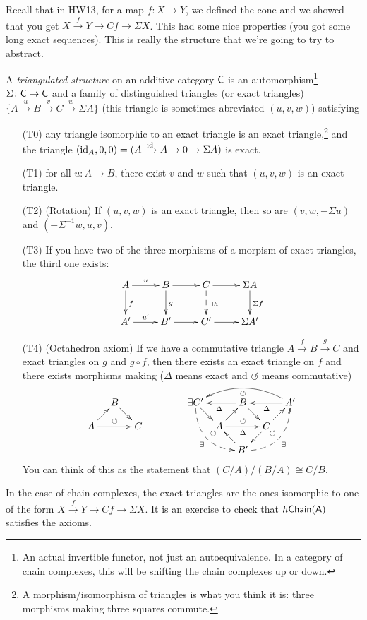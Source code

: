 Recall that in HW13, for a map $f\colon X\to Y$, we defined the cone and we showed that you get $X\xrightarrow f Y\to Cf\to \Sigma X$. This had some nice properties (you got some long exact sequences). This is really the structure that we're going to try to abstract.
\begin{definition}[Verdier]
 A \emph{triangulated structure} on an additive category $\text{\sf C}$ is an automorphism\footnote{An actual invertible functor, not just an autoequivalence. In a category of chain complexes, this will be shifting the chain complexes up or down.} $\Sigma\colon \text{\sf C}\to \text{\sf C}$ and a family of distinguished triangles (or exact triangles) $\{A\xrightarrow u B\xrightarrow v C \xrightarrow w \Sigma A\}$ (this triangle is sometimes abreviated $(u,v,w)$) satisfying
 \begin{enumerate}
  \item[(T0)] any triangle isomorphic to an exact triangle is an exact triangle,\footnote{A morphism/isomorphism of triangles is what you think it is: three morphisms making three squares commute.} and the triangle $(\operatorname{id}_A,0,0)=(A\xrightarrow {\operatorname{id}} A\to 0\to \Sigma A)$ is exact.
  \item[(T1)] for all $u\colon A\to B$, there exist $v$ and $w$ such that $(u,v,w)$ is an exact triangle.
  \item[(T2)] (Rotation) If $(u,v,w)$ is an exact triangle, then so are $(v,w,-\Sigma u)$ and $(-\Sigma^{-1}w,u,v)$. 
  \item[(T3)] If you have two of the three morphisms of a morpism of exact triangles, the third one exists:
  \[\xymatrix{
   A\ar[r]^u \ar[d]^{f} & B\ar[r]\ar[d]^g & C\ar[r]\ar@{-->}[d]^{\exists h} & \Sigma A \ar[d]^{\Sigma f}\\
   A'\ar[r]^{u'} & B'\ar[r] & C'\ar[r] & \Sigma A'
  }\]
  \item[(T4)] (Octahedron axiom) If we have a commutative triangle $A\xrightarrow f B\xrightarrow g C$ and exact triangles on $g$ and $g\circ f$, then there exists an exact triangle on $f$ and there exists morphisms making ($\Delta$ means exact and $\circlearrowleft$ means commutative)
 \[\xymatrix@!0{
  & B\ar[dr]\\
  A\ar[ur]\ar[rr]^\circlearrowleft & & C
 }\qquad\qquad\xymatrix@!0{
  \exists C' \ar@{-->}@/_4ex/[ddrr]_\exists^\circlearrowleft \ar[dr] & & B\ar[dr] \ar[ll]^\Delta & & A' \ar[ll]^\Delta \ar@/_3.5ex/[llll]^\circlearrowleft\\
  & A\ar[ur]\ar[rr]^\circlearrowleft_\Delta & & C\ar[ur]\ar[dl]\\
  & & B' \ar[ul] \ar@{-->}@/_4ex/[rruu]^\circlearrowleft_\exists
 }\]
 You can think of this as the statement that $(C/A)/(B/A)\cong C/B$. 
 \end{enumerate}
\end{definition}
In the case of chain complexes, the exact triangles are the ones isomorphic to one of the form $X\xrightarrow f Y\to Cf\to \Sigma X$. It is an exercise to check that $h\text{\sf Chain}(\text{\sf A})$ satisfies the axioms.

